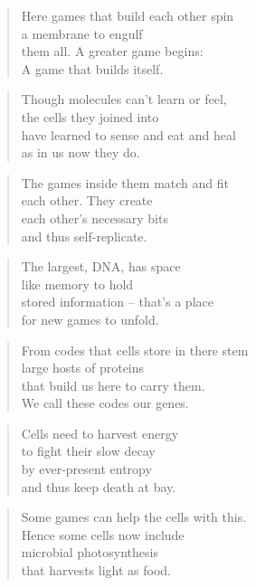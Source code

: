 \documentclass[14pt,a4paper]{article}
\begin{document}
\begin{verse}
Here games that build each other spin\\
a membrane to engulf\\
them all. A greater game begins:\\
A game that builds itself.
\end{verse}

\begin{verse}
Though molecules can’t learn or feel,\\
the cells they joined into\\
have learned to sense and eat and heal\\
as in us now they do.
\end{verse}

\begin{verse}
The games inside them match and fit\\
each other. They create\\
each other’s necessary bits\\
and thus self-replicate.
\end{verse}

\begin{verse}
The largest, DNA, has space\\
like memory to hold\\
stored information – that’s a place\\
for new games to unfold.
\end{verse}

\begin{verse}
From codes that cells store in there stem\\
large hosts of proteins\\
that build us here to carry them.\\
We call these codes our genes.
\end{verse}

\begin{verse}
Cells need to harvest energy\\
to fight their slow decay\\
by ever-present entropy\\
and thus keep death at bay.
\end{verse}

\begin{verse}
Some games can help the cells with this.\\
Hence some cells now include\\
microbial photosynthesis\\
that harvests light as food.
\end{verse}
\end{document}

